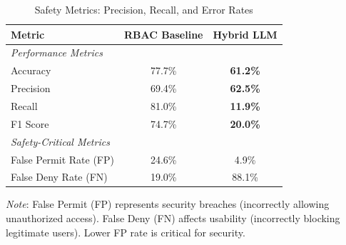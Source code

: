 \begin{table}[h]
    \centering
    \caption{Safety Metrics: Precision, Recall, and Error Rates}
    \label{tab:safety_metrics}
    \begin{tabular}{lcc}
        \toprule
        \textbf{Metric} & \textbf{RBAC Baseline} & \textbf{Hybrid LLM} \\
        \midrule
        \multicolumn{3}{l}{\textit{Performance Metrics}} \\
        Accuracy        & 77.7\% & \textbf{61.2\%} \\
        Precision       & 69.4\% & \textbf{62.5\%} \\
        Recall          & 81.0\% & \textbf{11.9\%} \\
        F1 Score        & 74.7\% & \textbf{20.0\%} \\
        \midrule
        \multicolumn{3}{l}{\textit{Safety-Critical Metrics}} \\
        False Permit Rate (FP)  & 24.6\% & 4.9\% \\
        False Deny Rate (FN)    & 19.0\% & 88.1\% \\
        \bottomrule
    \end{tabular}
\end{table}

\textit{Note}: False Permit (FP) represents security breaches (incorrectly allowing unauthorized access). False Deny (FN) affects usability (incorrectly blocking legitimate users). Lower FP rate is critical for security.
